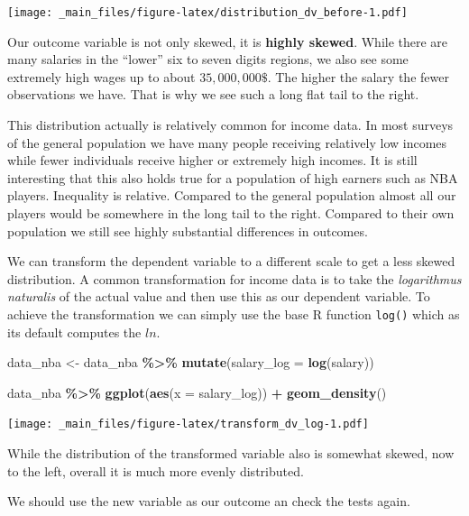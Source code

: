 \documentclass[
]{book}
\newenvironment{Shaded}{\begin{snugshade}}{\end{snugshade}}
\newcommand{\AttributeTok}[1]{\textcolor[rgb]{0.13,0.29,0.53}{#1}}
\newcommand{\FunctionTok}[1]{\textcolor[rgb]{0.13,0.29,0.53}{\textbf{#1}}}
\newcommand{\NormalTok}[1]{#1}
\newcommand{\OtherTok}[1]{\textcolor[rgb]{0.56,0.35,0.01}{#1}}
\newcommand{\SpecialCharTok}[1]{\textcolor[rgb]{0.81,0.36,0.00}{\textbf{#1}}}
\begin{document}
\texttt{[image: \_main\_files/figure-latex/distribution\_dv\_before-1.pdf]}

Our outcome variable is not only skewed, it is \textbf{highly skewed}. While there
are many salaries in the ``lower'' six to seven digits regions, we also see some
extremely high wages up to about \(35,000,000\$\). The higher the salary the fewer
observations we have. That is why we see such a long flat tail to the right.

This distribution actually is relatively common for income data. In most surveys
of the general population we have many people receiving relatively low incomes
while fewer individuals receive higher or extremely high incomes. It is still
interesting that this also holds true for a population of high earners such as
NBA players. Inequality is relative. Compared to the general
population almost all our players would be somewhere in the long tail to the
right. Compared to their own population we still see highly substantial
differences in outcomes.

We can transform the dependent variable to a different scale to get a less
skewed distribution. A common transformation for income data is to take the
\emph{logarithmus naturalis} of the actual value and then use this as our
dependent variable. To achieve the transformation we can simply use the base R
function \texttt{log()} which as its default computes the \(ln\).

\begin{Shaded}
\begin{Highlighting}[]
\NormalTok{data\_nba }\OtherTok{\textless{}{-}}\NormalTok{ data\_nba }\SpecialCharTok{\%\textgreater{}\%} 
  \FunctionTok{mutate}\NormalTok{(}\AttributeTok{salary\_log =} \FunctionTok{log}\NormalTok{(salary))}

\NormalTok{data\_nba }\SpecialCharTok{\%\textgreater{}\%} 
  \FunctionTok{ggplot}\NormalTok{(}\FunctionTok{aes}\NormalTok{(}\AttributeTok{x =}\NormalTok{ salary\_log)) }\SpecialCharTok{+}
  \FunctionTok{geom\_density}\NormalTok{()}
\end{Highlighting}
\end{Shaded}

\texttt{[image: \_main\_files/figure-latex/transform\_dv\_log-1.pdf]}

While the distribution of the transformed variable also is somewhat skewed, now
to the left, overall it is much more evenly distributed.

We should use the new variable as our outcome an check the tests again.
\end{document}
